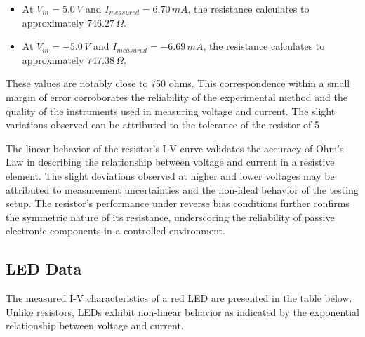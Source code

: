 \documentclass[12pt]{article}
\begin{document}
\begin{itemize}
	\item At \( V_{in} = 5.0 \, V \) and \( I_{measured} = 6.70 \, mA \), the resistance calculates to approximately \( 746.27 \, \Omega \).
	\item At \( V_{in} = -5.0 \, V \) and \( I_{measured} = -6.69 \, mA \), the resistance calculates to approximately \( 747.38 \, \Omega \).
\end{itemize}

These values are notably close to 750 ohms. This correspondence within a
small margin of error corroborates the reliability of the experimental method
and the quality of the instruments used in measuring voltage and current. The
slight variations observed can be attributed to the tolerance of the resistor of
5%

The linear behavior of the resistor's I-V curve validates the accuracy of
Ohm's Law in describing the relationship between voltage and current in a
resistive element. The slight deviations observed at higher and lower voltages
may be attributed to measurement uncertainties and the non-ideal behavior of the
testing setup. The resistor's performance under reverse bias conditions further
confirms the symmetric nature of its resistance, underscoring the reliability of
passive electronic components in a controlled environment.

\subsection{LED Data}
The measured I-V characteristics of a red LED are presented in the table below. Unlike resistors, LEDs exhibit non-linear behavior as indicated by the exponential relationship between voltage and current.
\end{document}
